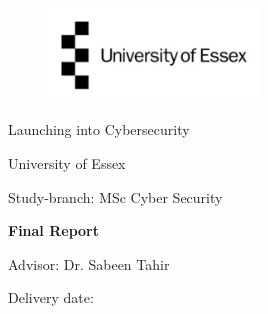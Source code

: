 
\label{titlePage}
\begin{figure}[h]
\centering
\includegraphics[width=0.50\textwidth]{pics/logo.pdf}
\end{figure}
\FloatBarrier

\begin{Large} 
\begin{center}
Launching into Cybersecurity
\end{center}
\end{Large} 

\vspace*{5mm}

\begin{large} 
\begin{center}
University of Essex
\end{center}
\end{large} 

\begin{large} 
\begin{center}
Study-branch: MSc Cyber Security
\end{center}
\end{large}



\begin{Large} 
\begin{center}
\textbf{Final Report}
\end{center}
\end{Large}

\vspace*{5mm}


\begin{large} 
\begin{center}
Advisor: Dr. Sabeen Tahir
\end{center}
\end{large} 


\vspace*{-6mm}

\begin{large} 
\begin{center}
Delivery date: 
\end{center}
\end{large} 


\pagestyle{empty} %

